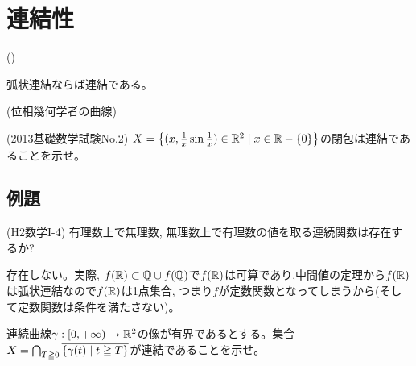 \section{連結性}

\begin{prop} ()
\ben
\item 弧状連結ならば連結である。
\item {}
\een
\end{prop}

\begin{egprob} (位相幾何学者の曲線)

\end{egprob}

\begin{prac} (2013基礎数学試験No.2)
$X = \left\{ (x, \frac{1}{x}\sin{\frac{1}{x}})\in \mathbb{R}^2 \mid x\in \mathbb{R}- \{ 0 \} \right\}$の閉包は連結であることを示せ。
\end{prac}




\subsection{例題}
\begin{egprob} (H2数学I-4)
有理数上で無理数, 無理数上で有理数の値を取る連続関数は存在するか?
\end{egprob}
\begin{egans}
存在しない。実際, $f(\mathbb{R})\subset \mathbb{Q}\cup f(\mathbb{Q})$で$f(\mathbb{R})$は可算であり,中間値の定理から$f(\mathbb{R})$は弧状連結なので$f(\mathbb{R})$は1点集合, つまり$f$が定数関数となってしまうから(そして定数関数は条件を満たさない)。
\end{egans}

\begin{egprob}
連続曲線$\gamma:[0,+\infty)\to \mathbb{R}^2$の像が有界であるとする。集合$X = \bigcap_{T\geqq 0} \overline{\{\gamma(t)\mid t\geqq T\}}$が連結であることを示せ。
\end{egprob}
\begin{egans}
\chatgpthint{$\ovl{\gamma([T,\infty))}$がコンパクト連結集合の減少列になることを使ってください。}
\end{egans}

